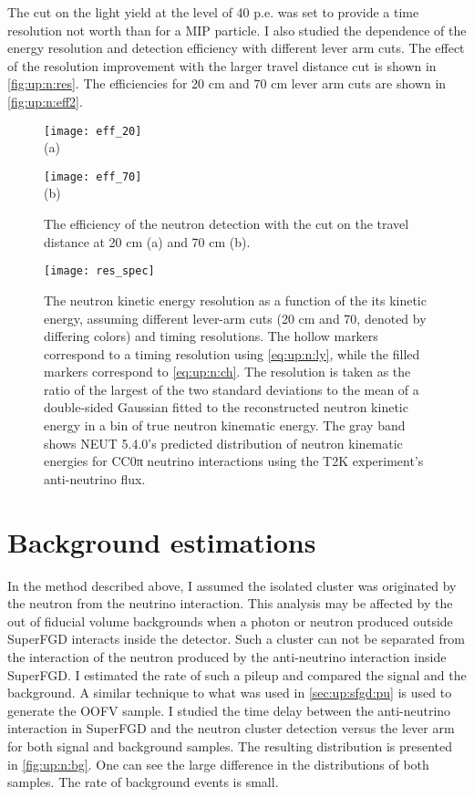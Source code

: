 \documentclass[main.tex]{subfiles}
\begin{document}
The cut on the light yield at the level of 40 p.e. was set to provide a time resolution not worth than for a MIP particle. I also studied the dependence of the energy resolution and detection efficiency with different lever arm cuts. The effect of the resolution improvement with the larger travel distance cut is shown in \autoref{fig:up:n:res}. The efficiencies for 20 cm and 70 cm lever arm cuts are shown in \autoref{fig:up:n:eff2}.

\begin{figure}[!ht]
	\centering
	\begin{minipage}{0.49\linewidth}
		\centering
		\texttt{[image: eff\_20]} \\ (a)
	\end{minipage}
	\begin{minipage}{0.49\linewidth}
		\centering
		\texttt{[image: eff\_70]} \\ (b)
	\end{minipage}
	\caption{The efficiency of the neutron detection with the cut on the travel distance at 20 cm (a) and 70 cm (b).}
	\label{fig:up:n:eff2}
\end{figure}

\begin{figure}[!ht]
	\centering
	\texttt{[image: res\_spec]}
	\caption{The neutron kinetic energy resolution as a function of the its kinetic energy, assuming different lever-arm cuts (20 cm and 70, denoted by differing colors) and timing resolutions. The hollow markers correspond to a timing resolution using \autoref{eq:up:n:ly}, while the filled markers correspond to \autoref{eq:up:n:ch}. The resolution is taken as the ratio of the largest of the two standard deviations to the mean of a double-sided Gaussian fitted to the reconstructed neutron kinetic energy in a bin of true neutron kinematic energy. The gray band shows NEUT 5.4.0’s predicted distribution of neutron kinematic energies for CC0π neutrino interactions using the T2K experiment’s anti-neutrino flux.}
	\label{fig:up:n:res}
\end{figure}

\section{Background estimations}
In the method described above, I assumed the isolated cluster was originated by the neutron from the neutrino interaction. This analysis may be affected by the out of fiducial volume backgrounds when a photon or neutron produced outside SuperFGD interacts inside the detector. Such a cluster can not be separated from the interaction of the neutron produced by the anti-neutrino interaction inside SuperFGD. I estimated the rate of such a pileup and compared the signal and the background. A similar technique to what was used in \autoref{sec:up:sfgd:pu} is used to generate the OOFV sample. I studied the time delay between the anti-neutrino interaction in SuperFGD and the neutron cluster detection versus the lever arm for both signal and background samples. The resulting distribution is presented in \autoref{fig:up:n:bg}. One can see the large difference in the distributions of both samples. The rate of background events is small.
\end{document}

